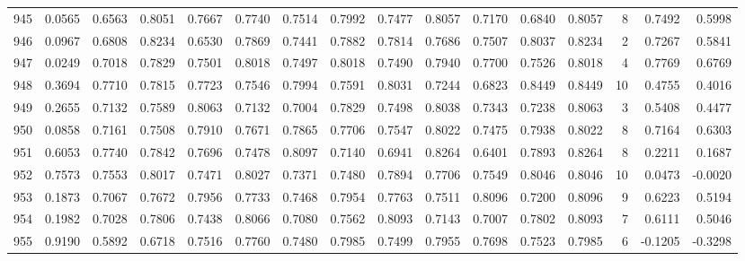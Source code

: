 \begin{tabular}{lrrrrrrrrrrrrrrr}
945 &      0.0565 &  0.6563 &  0.8051 &  0.7667 &  0.7740 &  0.7514 &  0.7992 &  0.7477 &  0.8057 &  0.7170 &   0.6840 &     0.8057 &      8 &                    0.7492 &                     0.5998 \\
946 &      0.0967 &  0.6808 &  0.8234 &  0.6530 &  0.7869 &  0.7441 &  0.7882 &  0.7814 &  0.7686 &  0.7507 &   0.8037 &     0.8234 &      2 &                    0.7267 &                     0.5841 \\
947 &      0.0249 &  0.7018 &  0.7829 &  0.7501 &  0.8018 &  0.7497 &  0.8018 &  0.7490 &  0.7940 &  0.7700 &   0.7526 &     0.8018 &      4 &                    0.7769 &                     0.6769 \\
948 &      0.3694 &  0.7710 &  0.7815 &  0.7723 &  0.7546 &  0.7994 &  0.7591 &  0.8031 &  0.7244 &  0.6823 &   0.8449 &     0.8449 &     10 &                    0.4755 &                     0.4016 \\
949 &      0.2655 &  0.7132 &  0.7589 &  0.8063 &  0.7132 &  0.7004 &  0.7829 &  0.7498 &  0.8038 &  0.7343 &   0.7238 &     0.8063 &      3 &                    0.5408 &                     0.4477 \\
950 &      0.0858 &  0.7161 &  0.7508 &  0.7910 &  0.7671 &  0.7865 &  0.7706 &  0.7547 &  0.8022 &  0.7475 &   0.7938 &     0.8022 &      8 &                    0.7164 &                     0.6303 \\
951 &      0.6053 &  0.7740 &  0.7842 &  0.7696 &  0.7478 &  0.8097 &  0.7140 &  0.6941 &  0.8264 &  0.6401 &   0.7893 &     0.8264 &      8 &                    0.2211 &                     0.1687 \\
952 &      0.7573 &  0.7553 &  0.8017 &  0.7471 &  0.8027 &  0.7371 &  0.7480 &  0.7894 &  0.7706 &  0.7549 &   0.8046 &     0.8046 &     10 &                    0.0473 &                    -0.0020 \\
953 &      0.1873 &  0.7067 &  0.7672 &  0.7956 &  0.7733 &  0.7468 &  0.7954 &  0.7763 &  0.7511 &  0.8096 &   0.7200 &     0.8096 &      9 &                    0.6223 &                     0.5194 \\
954 &      0.1982 &  0.7028 &  0.7806 &  0.7438 &  0.8066 &  0.7080 &  0.7562 &  0.8093 &  0.7143 &  0.7007 &   0.7802 &     0.8093 &      7 &                    0.6111 &                     0.5046 \\
955 &      0.9190 &  0.5892 &  0.6718 &  0.7516 &  0.7760 &  0.7480 &  0.7985 &  0.7499 &  0.7955 &  0.7698 &   0.7523 &     0.7985 &      6 &                   -0.1205 &                    -0.3298 \\

\end{tabular}
